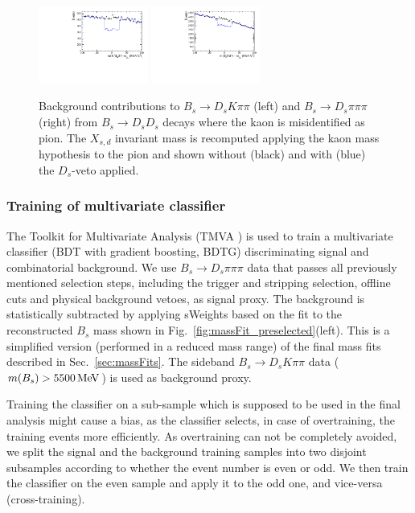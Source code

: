 \begin{figure}[h]
\centering
\includegraphics[height=!,width=0.32\textwidth]{figs/BkgStudies/signal_Bs2DsKpipi_as_Bs2DsDs_compareVeto.pdf} 
\includegraphics[height=!,width=0.32\textwidth]{figs/BkgStudies/norm_Bs2Dspipipi_as_Bs2DsDs_compareVeto.pdf} 
\caption{Background contributions to  $B_s \to D_s K\pi\pi$ (left) and $B_s \to D_s \pi\pi\pi$ (right) from $B_s \to D_s D_s$ decays where the kaon is misidentified as pion.
The $X_{s,d}$ invariant mass is recomputed applying the kaon mass hypothesis to the pion and shown without (black) and with (blue) the $D_s$-veto applied. 
}
\label{fig:vetoDs}
\end{figure}



\clearpage
\subsubsection{Training of multivariate classifier}

The Toolkit for Multivariate Analysis (TMVA \cite{Hocker:2007ht}) is used to train a multivariate classifier (BDT with gradient boosting, BDTG)
discriminating signal and combinatorial background.
We use $B_s\to D_s\pi\pi\pi$ data that passes all previously mentioned selection steps, including the trigger and stripping selection, offline cuts and physical background vetoes, 
as signal proxy. 
The background is statistically subtracted by applying \textsf{sWeights} based on the fit to the reconstructed $B_s$ mass shown in Fig.~\ref{fig:massFit_preselected}(left).
This is a simplified version (performed in a reduced mass range) of the final mass fits described in Sec.~\ref{sec:massFits}.
The sideband  $B_s\to D_sK\pi\pi$ data ($m(B_s) > 5500 \mathrm{\,Me\kern -0.1em V}$) is used as background proxy.

Training the classifier on a sub-sample which is supposed to be used in the
final analysis might cause a bias, as the classifier selects, in case of overtraining,  the training events more efficiently. 
As overtraining can not be completely avoided, we split the signal and
the background training samples into two disjoint subsamples according to whether the
event number is even or odd. We then train the classifier on the even sample and apply
it to the odd one, and vice-versa (cross-training).

